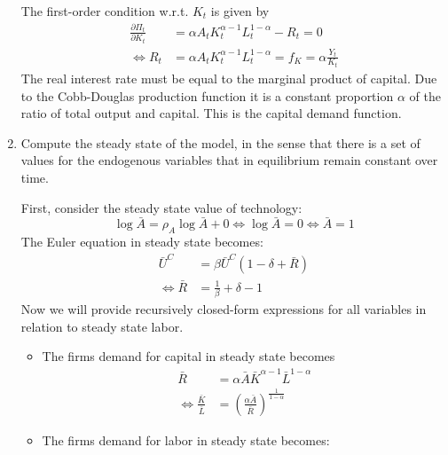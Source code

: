 \documentclass[a4paper]{scrartcl}
\begin{document}
\begin{enumerate}
\begin{solution}
                  The first-order condition w.r.t. $K_{t}$ is given by
                  \begin{align*}
                      \frac{\partial \Pi_t}{\partial K_{t}} & = \alpha A_t K_t^{\alpha-1} L_t^{1-\alpha} - R_t = 0                      \\
                      \Leftrightarrow R_t                   & = \alpha A_t K_t^{\alpha-1} L_t^{1-\alpha} = f_K = \alpha \frac{Y_t}{K_t}
                  \end{align*}
                  The real interest rate must be equal to the marginal product of capital. Due to the Cobb-Douglas production function it is a constant proportion $\alpha$ of the ratio of total output and capital. This is the capital demand function.
              \end{solution}
        \item Compute the steady state of the model, in the sense that there is a set of values for the endogenous variables that in equilibrium remain constant over time.
              \begin{solution}
                  First, consider the steady state value of technology: 
                  $$\log\bar{A}=\rho_A \log\bar{A} + 0 \Leftrightarrow \log\bar{A} = 0 \Leftrightarrow \bar{A} = 1$$
                  The Euler equation in steady state becomes:
                  \begin{align*}
                      \bar{U}^C               & = \beta \bar{U}^C(1-\delta+\bar{R}) \\
                      \Leftrightarrow \bar{R} & = \frac{1}{\beta} + \delta - 1
                  \end{align*}
                  Now we will provide recursively closed-form expressions for all variables in relation to steady state labor.
                  \begin{itemize}
                      \item The firms demand for capital in steady state becomes
                            \begin{align*}
                                \bar{R}                                 & = \alpha \bar{A} \bar{K}^{\alpha-1}\bar{L}^{1-\alpha}              \\
                                \Leftrightarrow \frac{\bar{K}}{\bar{L}} & = \left(\frac{\alpha \bar{A}}{\bar{R}}\right)^{\frac{1}{1-\alpha}}
                            \end{align*}
                      \item The firms demand for labor in steady state becomes:

\end{itemize}
\end{solution}
\end{enumerate}
\end{document}
